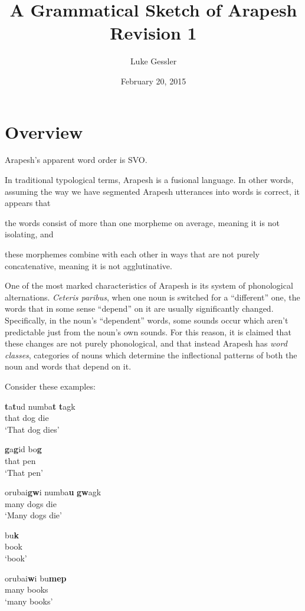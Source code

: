 \documentclass[pdftex,12pt,a4paper]{article}
\title{A Grammatical Sketch of Arapesh \\ Revision 1}
\author{Luke Gessler}
\date{February 20, 2015}
\begin{document}

\tableofcontents
\listoffigures
\pagebreak


\doublespacing
\section{Overview}

Arapesh's apparent word order is SVO.

In traditional typological terms, Arapesh is a fusional language. In other words, assuming the way we have segmented Arapesh utterances into words is correct, it appears that \begin{inparaenum} [(a)] \item the words consist of more than one morpheme on average, meaning it is not isolating, and \item these morphemes combine with each other in ways that are not purely concatenative, meaning it is not agglutinative. \end{inparaenum} 

One of the most marked characteristics of Arapesh is its system of phonological alternations. \emph{Ceteris paribus}, when one noun is switched for a ``different'' one, the words that in some sense ``depend'' on it are usually significantly changed. Specifically, in the noun's ``dependent'' words, some sounds occur which aren't predictable just from the noun's own sounds. For this reason, it is claimed that these changes are not purely phonological, and that instead Arapesh has \emph{word classes}, categories of nouns which determine the inflectional patterns of both the noun and words that depend on it.

Consider these examples:

\begin{exe}

\ex
\gll \textbf{t}a\textbf{t}ud numba\textbf{t} \textbf{t}agk \\
that dog die \\
\trans `That dog dies'

\ex
\gll \textbf{g}a\textbf{g}id bo\textbf{g}\\
that pen\\
\trans `That pen'

\ex
\gll orubai\textbf{gw}i numba\textbf{u} \textbf{gw}agk \\
many dogs die \\
\trans `Many dogs die'

\ex
\gll bu\textbf{k} \\
book \\
\trans `book'

\ex
\gll orubai\textbf{w}i bu\textbf{mep} \\
many books\\
\trans `many books'

\end{exe}
\end{document}
